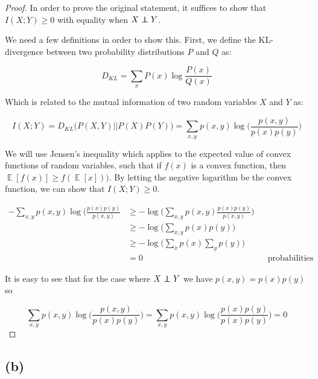 \documentclass[11pt]{amsart}
\newcommand\independent{\protect\mathpalette{\protect\independenT}{\perp}}
\DeclareMathOperator{\E}{\mathbb{E}}
\def\independenT#1#2{\mathrel{\rlap{$#1#2$}\mkern2mu{#1#2}}}
\begin{document}
\begin{proof}
In order to prove the original statement, it suffices to show that $I(X;Y) \geq 0$ with equality when  $X \independent Y$.

We need a few definitions in order to show this. First, we define the KL-divergence between two probability distributions $P$ and $Q$ as:

\begin{equation}
D_{KL} = \sum_{x} P(x) \log \frac{P(x)}{Q(x)}
\end{equation}

Which is related to the mutual information of two random variables $X$ and $Y$ as:

\begin{equation}
I(X;Y) = D_{KL}\big(P(X,Y) \vert \vert P(X)P(Y)\big) = \sum_{x,y} p(x,y) \log \bigg( \frac{p(x,y)}{p(x)p(y)} \bigg)
\label{eq:kl-mutual}
\end{equation}

We will use Jensen's inequality which applies to the expected value of convex functions of random variables, such that if $f(x)$ is a convex function, then $\E [f(x)] \geq f(\E [x]))$. By letting the negative logarithm be the convex function, we can show that $I(X;Y) \geq 0$.

\begin{equation}
\begin{aligned}
-\sum_{x,y} p(x,y) \log(\frac{p(x)p(y)}{p(x,y)} & \geq -\log \bigg( \sum_{x,y} p(x,y) \frac{p(x)p(y)}{p(x,y)} \bigg) \\
								   & \geq -\log \bigg ( \sum_{x,y} p(x)p(y) \bigg) \\
								   & \geq -\log \bigg( \sum_{x} p(x) \sum_{y} p(y) \bigg) \\
								   & = 0 && \text{probabilities sum to 1}
\label{eq:mutual-pos}
\end{aligned}
\end{equation}

It is easy to see that for the case where $X \independent Y$ we have $p(x,y) = p(x)p(y)$ so 

\begin{equation}
\sum_{x,y} p(x,y) \log\bigg(\frac{p(x,y)}{p(x)p(y)}\bigg) = \sum_{x,y} p(x,y) \log\bigg(\frac{p(x)p(y)}{p(x)p(y)}\bigg) = 0
\end{equation}

\end{proof}


\subsection{(b)}
\end{document}
